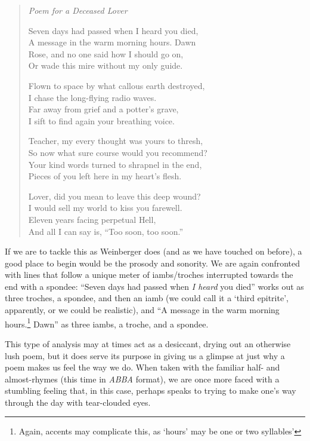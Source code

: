 \documentclass[12pt,oneside]{memoir}
\begin{document}
\begin{verse}
\emph{Poem for a Deceased Lover}

Seven days had passed when I heard you died, \\
A message in the warm morning hours. Dawn \\
Rose, and no one said how I should go on, \\
Or wade this mire without my only guide.

Flown to space by what callous earth destroyed, \\
I chase the long-flying radio waves. \\
Far away from grief and a potter's grave, \\
I sift to find again your breathing voice.

Teacher, my every thought was yours to thresh, \\
So now what sure course would you recommend? \\
Your kind words turned to shrapnel in the end, \\
Pieces of you left here in my heart's flesh.

Lover, did you mean to leave this deep wound? \\
I would sell my world to kiss you farewell. \\
Eleven years facing perpetual Hell, \\
And all I can say is, ``Too soon, too soon.''

\parencite[14]{leaves}
\end{verse}

If we are to tackle this as Weinberger does (and as we have touched on before), a good place to begin would be the prosody and sonority. We are again confronted with lines that follow a unique meter of iambs/troches interrupted towards the end with a spondee: ``Seven days had passed when \emph{I heard} you died'' works out as three troches, a spondee, and then an iamb (we could call it a `third epitrite', apparently, or we could be realistic), and ``A message in the warm morning hours.\footnote{Again, accents may complicate this, as `hours' may be one or two syllables'} Dawn'' as three iambs, a troche, and a spondee. 

This type of analysis may at times act as a desiccant, drying out an otherwise lush poem, but it does serve its purpose in giving us a glimpse at just why a poem makes us feel the way we do. When taken with the familiar half- and almost-rhymes (this time in \emph{ABBA} format), we are once more faced with a stumbling feeling that, in this case, perhaps speaks to trying to make one's way through the day with tear-clouded eyes.
\end{document}
